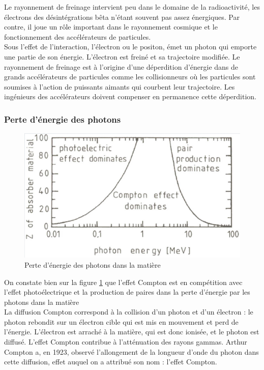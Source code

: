 Le rayonnement de freinage intervient peu dans le domaine de la radioactivité, les électrons des désintégrations bêta n'étant souvent pas assez énergiques. Par contre, il joue un rôle important dans le rayonnement cosmique et le fonctionnement des accélérateurs de particules. \\

Sous l’effet de l’interaction, l’électron ou le positon, émet un photon qui emporte une partie de son énergie. L’électron est freiné et sa trajectoire modifiée. Le rayonnement de freinage est à l’origine d’une déperdition d’énergie dans de grands accélérateurs de particules comme les collisionneurs où les particules sont soumises à l’action de puissants aimants qui courbent leur trajectoire. Les ingénieurs des accélérateurs doivent compenser en permanence cette déperdition.

\subsubsection{Perte d'énergie des photons}
\begin{figure}[ht]
    \centering
    \includegraphics[scale=0.60]{Images1/pertephotons.PNG}
    \caption{Perte d'énergie des photons dans la matière}
    \label{fig:pertes_energie_photos}
\end{figure}
On constate bien sur la figure \ref{fig:pertes_energie_photos} que l'effet Compton est en compétition avec l'effet photoélectrique et la production de paires dans la perte d'énergie par les photons dans la matière\\

La diffusion Compton correspond à la collision d’un photon et d’un électron : le photon rebondit sur un électron cible qui est mis en mouvement et perd de l’énergie. L'électron est arraché à la matière, qui est donc ionisée, et le photon est diffusé. L'effet Compton contribue à l'atténuation des rayons gammas.  Arthur Compton a, en 1923, observé l'allongement de la longueur d'onde du photon dans cette diffusion, effet auquel on a attribué son nom : l'effet Compton.

